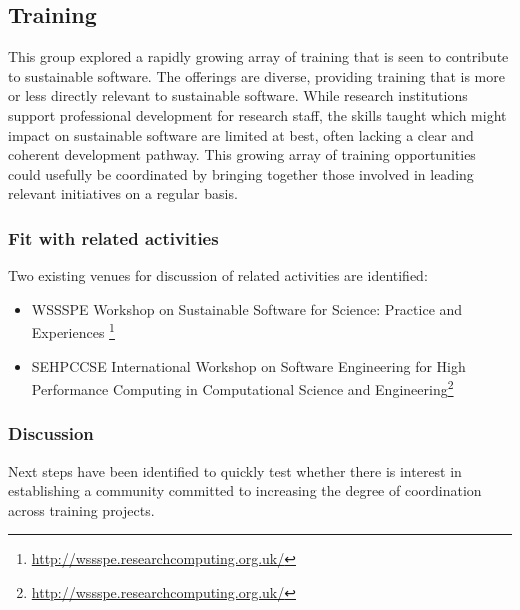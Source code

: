\subsection{Training}


This group explored a rapidly growing array of training that is seen to
contribute to sustainable software. The offerings are diverse, providing
training that is more or less directly relevant to sustainable software. While
research institutions support professional development for research staff, the
skills taught which might impact on sustainable software are limited at best,
often lacking a clear and coherent development pathway. This growing array of
training opportunities could usefully be coordinated by bringing together those
involved in leading relevant initiatives on a regular basis.

\subsubsection{Fit with related activities} Two existing venues for discussion
of related activities are identified:

\begin{itemize}

\item WSSSPE Workshop on Sustainable Software for Science: Practice and
Experiences \footnote{\url{http://wssspe.researchcomputing.org.uk/}}

\item SEHPCCSE International Workshop on Software Engineering for High
Performance Computing in Computational Science and
Engineering\footnote{\url{http://wssspe.researchcomputing.org.uk/}}

\end{itemize}

\subsubsection{Discussion}

Next steps have been identified to quickly test whether there is interest in
establishing a community committed to increasing the degree of coordination
across training projects.

